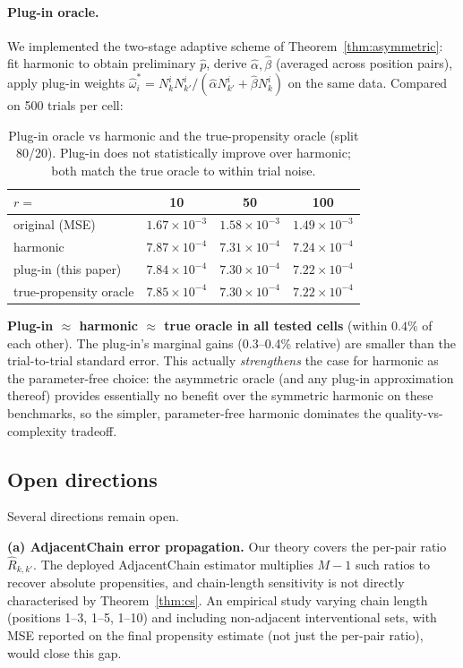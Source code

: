 \documentclass[sigconf]{acmart}
\begin{document}
\paragraph{Plug-in oracle.}
We implemented the two-stage adaptive scheme of Theorem~\ref{thm:asymmetric}:
fit harmonic to obtain preliminary $\hat{p}$, derive
$\hat{\alpha}, \hat{\beta}$ (averaged across position pairs), apply plug-in
weights $\hat{\omega}_i^* = N_k^i N_{k'}^i/(\hat{\alpha} N_{k'}^i +
\hat{\beta} N_k^i)$ on the same data. Compared on 500 trials per cell:

\begin{table}[h]
\centering
\small
\caption{Plug-in oracle vs harmonic and the true-propensity oracle (split
80/20). Plug-in does not statistically improve over harmonic; both match
the true oracle to within trial noise.}
\label{tab:plugin}
\begin{tabular}{lccc}
\toprule
$r=$ & 10 & 50 & 100 \\
\midrule
original (MSE)            & $1.67{\times}10^{-3}$ & $1.58{\times}10^{-3}$ & $1.49{\times}10^{-3}$ \\
harmonic                  & $7.87{\times}10^{-4}$ & $7.31{\times}10^{-4}$ & $7.24{\times}10^{-4}$ \\
plug-in (this paper)      & $7.84{\times}10^{-4}$ & $7.30{\times}10^{-4}$ & $7.22{\times}10^{-4}$ \\
true-propensity oracle    & $7.85{\times}10^{-4}$ & $7.30{\times}10^{-4}$ & $7.22{\times}10^{-4}$ \\
\bottomrule
\end{tabular}
\end{table}

\noindent\textbf{Plug-in $\approx$ harmonic $\approx$ true oracle in all
tested cells} (within $0.4\%$ of each other). The plug-in's marginal gains
(0.3--0.4\% relative) are smaller than the trial-to-trial standard error.
This actually \emph{strengthens} the case for harmonic as the parameter-free
choice: the asymmetric oracle (and any plug-in approximation thereof)
provides essentially no benefit over the symmetric harmonic on these
benchmarks, so the simpler, parameter-free harmonic dominates the
quality-vs-complexity tradeoff.

\subsection{Open directions}
\label{sec:open_directions}
Several directions remain open.

\textbf{(a) AdjacentChain error propagation.}
Our theory covers the per-pair ratio $\hat{R}_{k,k'}$. The deployed AdjacentChain estimator
multiplies $M-1$ such ratios to recover absolute propensities, and chain-length sensitivity is
not directly characterised by Theorem~\ref{thm:cs}. An empirical study varying chain
length (positions 1--3, 1--5, 1--10) and including non-adjacent interventional sets, with MSE
reported on the final propensity estimate (not just the per-pair ratio), would close this gap.
\end{document}
